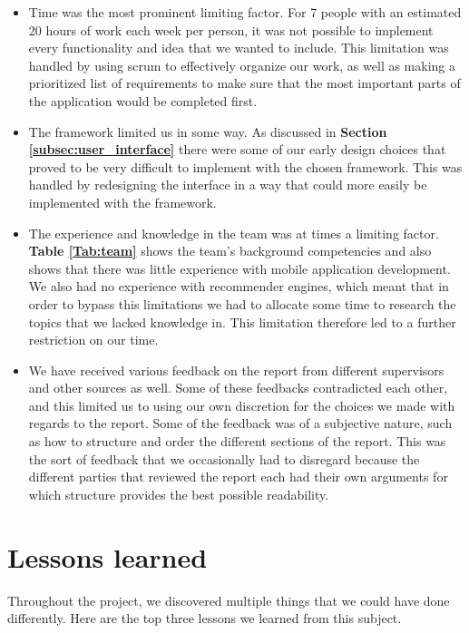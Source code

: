 \begin{itemize}
\item Time was the most prominent limiting factor. For 7 people with an estimated 20 hours of work each week per person, it was not possible to implement every functionality and idea that we wanted to include. This limitation was handled by using scrum to effectively organize our work, as well as making a prioritized list of requirements to make sure that the most important parts of the application would be completed first.

\item The framework limited us in some way. As discussed in \textbf{Section \ref{subsec:user_interface}} there were some of our early design choices that proved to be very difficult to implement with the chosen framework. This was handled by redesigning the interface in a way that could more easily be implemented with the framework. 

\item The experience and knowledge in the team was at times a limiting factor. \textbf{Table \ref{Tab:team}} shows the team's background competencies and also shows that there was little experience with mobile application development. We also had no experience with recommender engines, which meant that in order to bypass this limitations we had to allocate some time to research the topics that we lacked knowledge in. This limitation therefore led to a further restriction on our time.

\item We have received various feedback on the report from different supervisors and other sources as well. Some of these feedbacks contradicted each other, and this limited us to using our own discretion for the choices we made with regards to the report. Some of the feedback was of a subjective nature, such as how to structure and order the different sections of the report. This was the sort of feedback that we occasionally had to disregard because the different parties that reviewed the report each had their own arguments for which structure provides the best possible readability.

\end{itemize}

\section{Lessons learned}

Throughout the project, we discovered multiple things that we could have done differently. Here are the top three lessons we learned from this subject.

